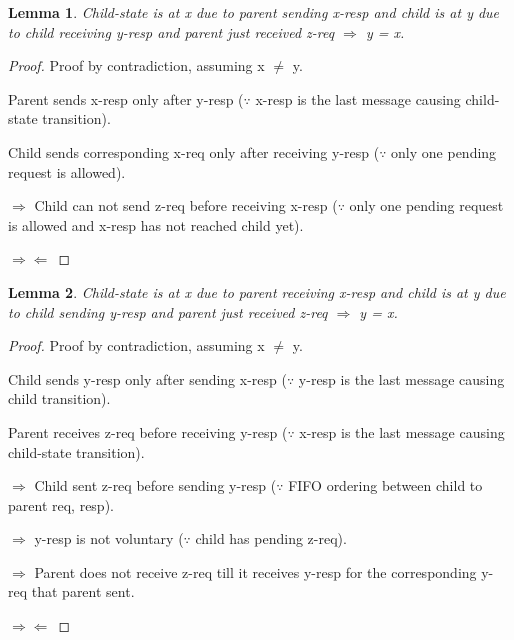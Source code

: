 \documentclass{article}
\newtheorem{lemma}{Lemma}
\begin{document}
\begin{lemma}
Child-state is at x due to parent sending x-resp and child is at y due to child receiving y-resp and parent just received z-req $\Rightarrow$ y = x.
\label{CRecvPSendReq}
\end{lemma}

\begin{proof}

Proof by contradiction, assuming x $\neq$ y.

\begin{figure}
\centering
\end{figure}

Parent sends x-resp only after y-resp ($\because$ x-resp is the last message causing child-state transition).

Child sends corresponding x-req only after receiving y-resp ($\because$ only one pending request is allowed).

$\Rightarrow$ Child can not send z-req before receiving x-resp ($\because$ only one pending request is allowed and x-resp has not reached child yet).

$\Rightarrow \Leftarrow$

\end{proof}

\begin{lemma}
Child-state is at x due to parent receiving x-resp and child is at y due to child sending y-resp and parent just received z-req $\Rightarrow$ y = x.
\label{CSendPRecvReq}
\end{lemma}

\begin{proof}

Proof by contradiction, assuming x $\neq$ y.

\begin{figure}
\centering
\end{figure}

Child sends y-resp only after sending x-resp ($\because$ y-resp is the last message causing child transition).

Parent receives z-req before receiving y-resp ($\because$ x-resp is the last message causing child-state transition).

$\Rightarrow$ Child sent z-req before sending y-resp ($\because$ FIFO ordering between child to parent req, resp).

$\Rightarrow$ y-resp is not voluntary ($\because$ child has pending z-req).

$\Rightarrow$ Parent does not receive z-req till it receives y-resp for the corresponding y-req that parent sent.

$\Rightarrow \Leftarrow$

\end{proof}
\end{document}
